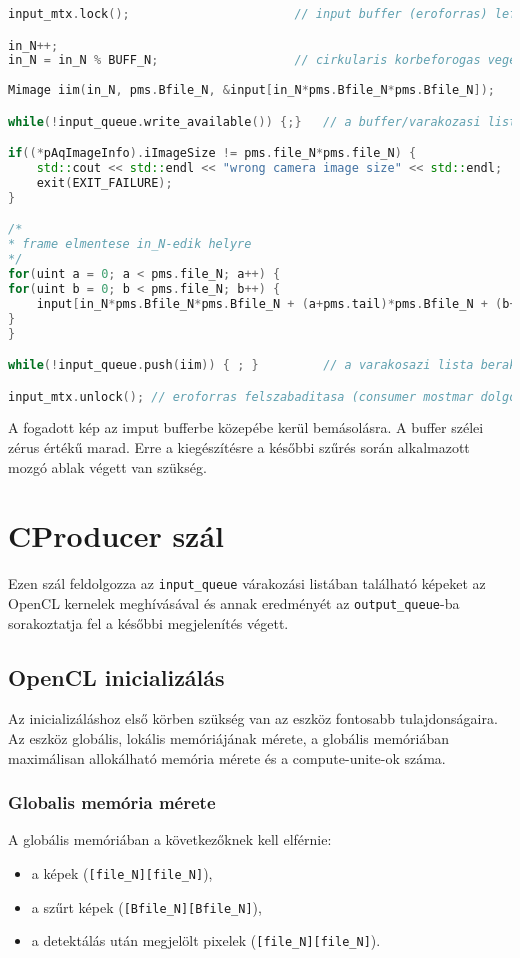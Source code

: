 \begin{lstlisting}[language=C++]
input_mtx.lock();						// input buffer (eroforras) lefoglalasa

in_N++;
in_N = in_N % BUFF_N;					// cirkularis korbeforogas vegett
 
Mimage iim(in_N, pms.Bfile_N, &input[in_N*pms.Bfile_N*pms.Bfile_N]);

while(!input_queue.write_available()) {;}	// a buffer/varakozasi lista kiurulesere varas

if((*pAqImageInfo).iImageSize != pms.file_N*pms.file_N) {
	std::cout << std::endl << "wrong camera image size" << std::endl;
	exit(EXIT_FAILURE);
}

/*
* frame elmentese in_N-edik helyre
*/
for(uint a = 0; a < pms.file_N; a++) {
for(uint b = 0; b < pms.file_N; b++) {
	input[in_N*pms.Bfile_N*pms.Bfile_N + (a+pms.tail)*pms.Bfile_N + (b+pms.tail)] = (*pAqImageInfo).pImageBuffer[a*pms.file_N + b];
}
}

while(!input_queue.push(iim)) { ; }			// a varakosazi lista berakas

input_mtx.unlock(); // eroforras felszabaditasa (consumer mostmar dolgozhat rajta)
\end{lstlisting}
	
	A fogadott kép az imput bufferbe közepébe kerül bemásolásra. A buffer szélei zérus értékű marad. Erre a kiegészítésre a későbbi
	szűrés során alkalmazott mozgó ablak végett van szükség.
	
\section{CProducer szál}
Ezen szál feldolgozza az \texttt{input\_queue} várakozási listában található képeket az OpenCL kernelek meghívásával és annak
eredményét az \texttt{output\_queue}-ba sorakoztatja fel a későbbi megjelenítés végett.
	
	\subsection{OpenCL inicializálás}
	Az inicializáláshoz első körben szükség van az eszköz fontosabb tulajdonságaira. Az eszköz globális, lokális memóriájának mérete,
	a globális memóriában maximálisan allokálható memória mérete és a compute-unite-ok száma.
	\subsubsection{Globalis memória mérete}
	A globális memóriában a következőknek kell elférnie:
	\begin{itemize}[noitemsep]
	  \item a képek (\texttt{[file\_N][file\_N]}),
	  \item a szűrt képek (\texttt{[Bfile\_N][Bfile\_N]}),
	  \item a detektálás után megjelölt pixelek (\texttt{[file\_N][file\_N]}).
	\end{itemize}
	
